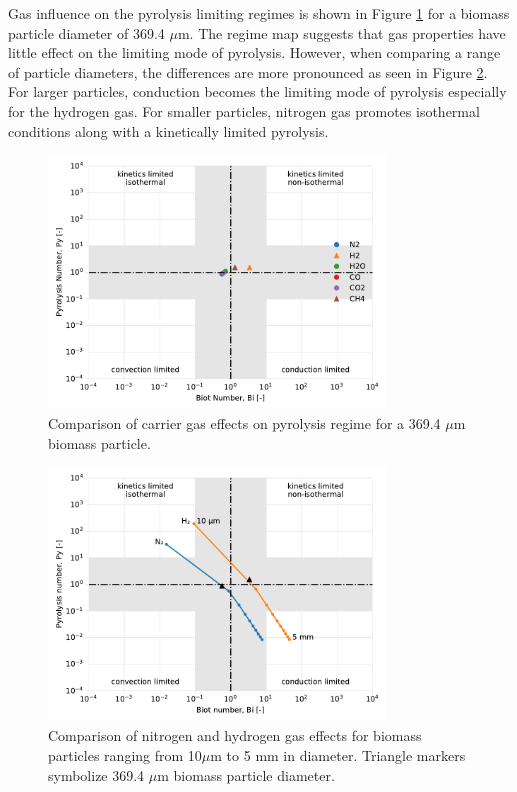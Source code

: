 Gas influence on the pyrolysis limiting regimes is shown in Figure \ref{fig:biot-pyro-gases} for a biomass particle diameter of 369.4 $\mu$m. The regime map suggests that gas properties have little effect on the limiting mode of pyrolysis. However, when comparing a range of particle diameters, the differences are more pronounced as seen in Figure \ref{fig:biot-pyro-diams}. For larger particles, conduction becomes the limiting mode of pyrolysis especially for the hydrogen gas. For smaller particles, nitrogen gas promotes isothermal conditions along with a kinetically limited pyrolysis.

\begin{figure}[H]
    \centering
    \includegraphics[width=0.8\textwidth]{figures/biot-pyro-gases.pdf}
    \caption{Comparison of carrier gas effects on pyrolysis regime for a 369.4 $\mu$m biomass particle.}
    \label{fig:biot-pyro-gases}
\end{figure}

\begin{figure}[H]
    \centering
    \includegraphics[width=0.8\textwidth]{figures/biot-pyro-diams.pdf}
    \caption{Comparison of nitrogen and hydrogen gas effects for biomass particles ranging from 10$\mu$m to 5 mm in diameter. Triangle markers symbolize 369.4 $\mu$m biomass particle diameter.}
    \label{fig:biot-pyro-diams}
\end{figure}

